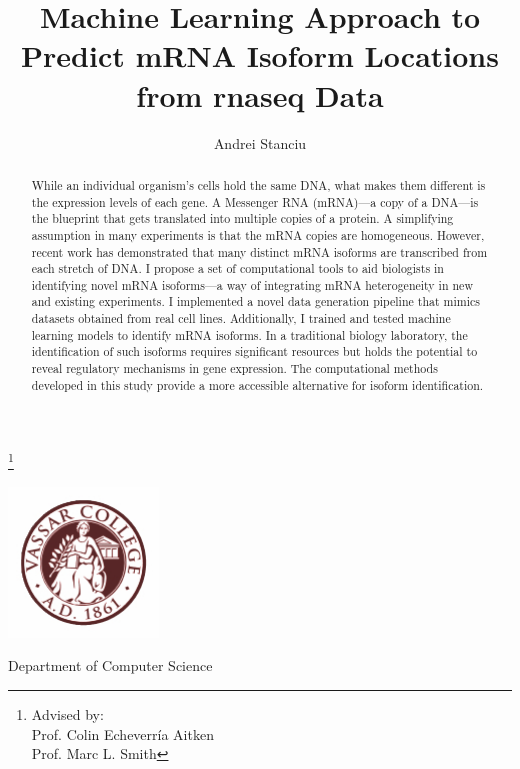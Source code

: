 \documentclass[12pt]{article}
\title{%
    Machine Learning Approach to Predict mRNA Isoform Locations from \acrshort{rnaseq} Data }
\author{Andrei Stanciu}
\begin{document}
\maketitle


\begin{center}
    
\thanks{Advised by: \\ Prof. Colin Echeverría Aitken \\ Prof. Marc L. Smith}
    
       \vspace{0.8cm}
     
    
       \includegraphics[width=0.3\textwidth]{vassar-logo.jpg}
            
       Department of Computer Science
    
            
\end{center}

\newpage

\begin{abstract}
While an individual organism's cells hold the same DNA, what makes them different is the expression levels of each gene. A Messenger RNA (mRNA)---a copy of a DNA---is the blueprint that gets translated into multiple copies of a protein. 
A simplifying assumption in many experiments is that the mRNA copies are
homogeneous. However, recent work has demonstrated that many distinct mRNA isoforms are
transcribed from each stretch of DNA. I propose a set of computational tools to aid biologists in identifying novel mRNA isoforms---a way of integrating mRNA heterogeneity in new and existing experiments. I implemented a novel data generation pipeline that mimics datasets obtained from real cell lines. Additionally, I trained and tested machine learning models to identify mRNA isoforms. 
In a traditional biology laboratory, the identification of such isoforms requires significant resources but holds the potential to reveal regulatory mechanisms in gene expression. The
computational methods developed in this study provide a more accessible alternative for isoform
identification. 
\end{abstract}
\end{document}
